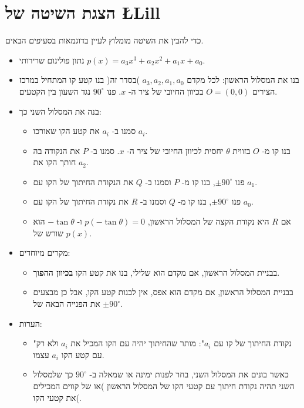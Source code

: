 


\section{הצגת השיטה של
\L{Lill}}\label{s.method}

כדי להבין את השיטה מומלוץ לעיין בדוגמאות בסעיפים הבאים.
\begin{itemize}
\item 
נתון פולינום שרירותי
$p(x)=a_3x^3+a_2x^2+a_1x+a_0$.
\item 
בנו את המסלול הראשון: לכל מקדם
$a_3,a_2,a_1,a_0$
)בסדר זה( בנו קטע קו המתחיל במרכז הצירים
$O=(0,0)$
בכיוון החיובי של ציר ה-%
$x$.
פנו
$90^\circ$
נגד השעון בין הקטעים.
\item 
בנה את המסלול השני כך:
\begin{itemize}
\item
סמנו ב-%
$a_i$
את קטע הקו שאורכו
$a_i$.
\item
בנו קו מ-%
$O$
בזווית 
$\theta$ 
יחסית לכיוון החיובי של ציר ה-%
$x$.
סמנו ב-%
$P$
את הנקודה בה חותך הקו את 
$a_2$.
\item
פנו
$\pm 90^\circ$,
בנו קו מ-%
$P$
וסמנו ב-%
$Q$
את הנקודת החיתוך של הקו עם
$a_1$.
\item
פנו
$\pm 90^\circ$,
בנו קו מ-%
$Q$
וסמנו ב-%
$R$
את נקודת החיתוך של הקו עם
$a_0$.
\item
אם 
$R$
היא נקודת הקצה של המסלול הראשון, 
$p(-\tan\theta)=0$
ו-%
$-\tan\theta$
הוא שורש של 
$p(x)$.
\end{itemize}
\item
מקרים מיוחדים:
\begin{itemize}
\item 
בבניית המסלול הראשון, אם מקדם הוא שלילי, בנו את קטע הקו
\textbf{בכיוון ההפוך}.
\item
בבניית המסלול הראשון, אם מקדם הוא אפס, אין לבנות קטע הקו, אבל כן מבצעים את הפנייה הבאה של
$\pm90^\circ$.
\end{itemize}
\item הערות:
\begin{itemize}
\item 
"נקודת החיתוך של קו עם
$a_i$":
מותר שהחיתוך יהיה עם הקו המכיל את
$a_i$
ולא רק עם קטע הקו 
$a_i$
עצמו.
\item
כאשר בונים את המסלול השני, בחר לפנות ימינה או שמאלה ב-%
$90^\circ$
כך שלמסלול השני תהיה נקודת חיתוך עם קטעי הקו של המסלול הראשון )או של קווים המכילים את קטעי הקו(.
\end{itemize}
\end{itemize}

